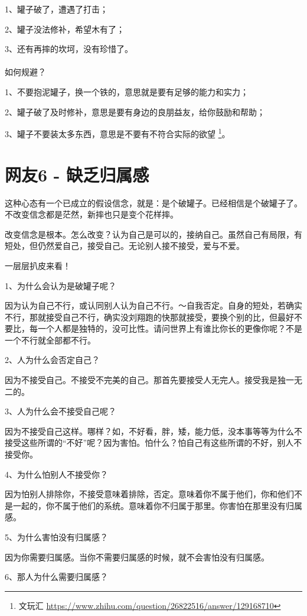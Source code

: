 1、罐子破了，遭遇了打击；

2、罐子没法修补，希望木有了；

3、还有再摔的坎坷，没有珍惜了。\\ \\

如何规避？

1、不要抱泥罐子，换一个铁的，意思就是要有足够的能力和实力；

2、罐子破了及时修补，意思是要有身边的良朋益友，给你鼓励和帮助；

3、罐子不要装太多东西，意思是不要有不符合实际的欲望 \footnote{文玩汇 \quad \url{https://www.zhihu.com/question/26822516/answer/129168710}}。

\section{网友6 - 缺乏归属感}
这种心态有一个已成立的假设信念，就是：是个破罐子。已经相信是个破罐子了。不改变信念都是茫然，新摔也只是变个花样摔。

改变信念是根本。怎么改变？认为自己是可以的，接纳自己。虽然自己有局限，有短处，但仍然爱自己，接受自己。无论别人接不接受，爱与不爱。

一层层扒皮来看！

1、为什么会认为是破罐子呢？

因为认为自己不行，或认同别人认为自己不行。～自我否定。自身的短处，若确实不行，那就接受自己不行，确实没刘翔跑的快那就接受，要换个别的比，但最好不要比，每一个人都是独特的，没可比性。请问世界上有谁比你长的更像你呢？不是一个不行就全部都不行。

2、人为什么会否定自己？

因为不接受自己。不接受不完美的自己。那首先要接受人无完人。接受我是独一无二的。

3、人为什么会不接受自己呢？

因为不接受自己这样。哪样？如，不好看，胖，矮，能力低，没本事等等为什么不接受这些所谓的“不好”呢？因为害怕。怕什么？怕自己有这些所谓的不好，别人不接受你。

4、为什么怕别人不接受你？

因为怕别人排除你，不接受意味着排除，否定。意味着你不属于他们，你和他们不是一起的，你不属于他们的系统。意味着你不归属于那里。你害怕在那里没有归属感。

5、为什么害怕没有归属感？

因为你需要归属感。当你不需要归属感的时候，就不会害怕没有归属感。

6、那人为什么需要归属感？

